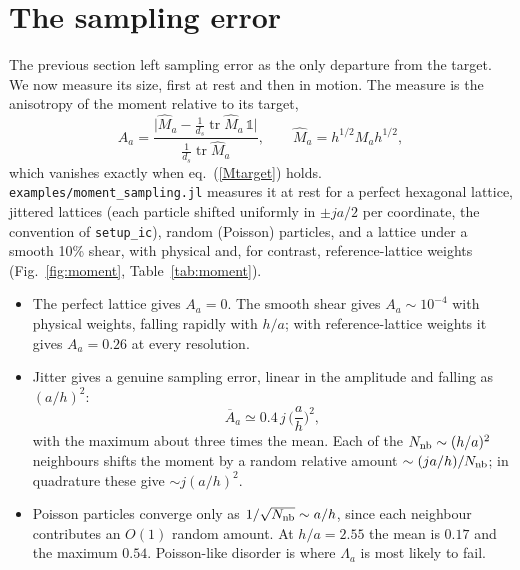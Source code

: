 \documentclass[11pt,aps,preprint,nofootinbib,superscriptaddress,tightenlines]{revtex4-2}
\def\st{\begin{equation}}
\def\stp{\end{equation}}
\def\Eq#1{eq.~(\ref{#1})}
\def\Fig#1{Fig.~\ref{#1}}
\providecommand{\tr}{\operatorname{tr}}
\newcommand{\one}{\mathds{1}}
\begin{document}
\section{The sampling error}
\label{sec:sampling}

The previous section left sampling error as the only departure from the
target.  We now measure its size, first at rest and then in motion.  The
measure is the anisotropy of the moment relative to its target,
\st
A_a=\frac{\big|\hat M_a-\frac1{d_s}\tr\hat M_a\,\one\big|}{\frac1{d_s}\tr\hat M_a},
\qquad \hat M_a=h^{1/2}M_ah^{1/2} ,
\stp
which vanishes exactly when \Eq{Mtarget} holds.  \texttt{examples/moment\_sampling.jl}
measures it at rest for a perfect hexagonal lattice, jittered lattices (each
particle shifted uniformly in $\pm ja/2$ per coordinate, the convention of
\texttt{setup\_ic}), random (Poisson) particles, and a lattice under a smooth
10\% shear, with physical and, for contrast, reference-lattice weights (\Fig{fig:moment},
Table~\ref{tab:moment}).
\begin{itemize}
\item The perfect lattice gives $A_a=0$.  The smooth shear gives $A_a\sim10^{-4}$
  with physical weights, falling rapidly with $h/a$; with reference-lattice weights it gives
  $A_a=0.26$ at every resolution.
\item Jitter gives a genuine sampling error, linear in the amplitude and falling
  as $(a/h)^2$:
  \st
  \overline{A}_a\simeq0.4\,j\,\Big(\frac{a}{h}\Big)^2 ,
  \label{Ascaling}
  \stp
  with the maximum about three times the mean.  Each of the
  $N_{\rm nb}\sim(h/a)^2$ neighbours shifts the moment by a random relative amount
  $\sim(ja/h)/N_{\rm nb}$; in quadrature these give $\sim j(a/h)^2$.
\item Poisson particles converge only as $1/\sqrt{N_{\rm nb}}\sim a/h$, since each
  neighbour contributes an $O(1)$ random amount.  At $h/a=2.55$ the mean is $0.17$
  and the maximum $0.54$.  Poisson-like disorder is where $\Lambda_a$ is most likely
  to fail.
\end{itemize}
\end{document}
